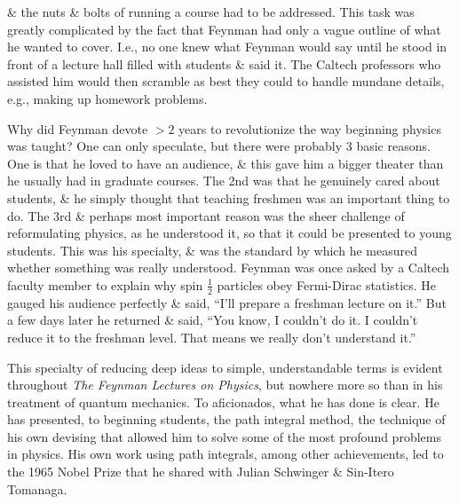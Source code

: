 \documentclass{article}
\begin{document}
\& the nuts \& bolts of running a course had to be addressed. This task was greatly complicated by the fact that {\sc Feynman} had only a vague outline of what he wanted to cover. I.e., no one knew what {\sc Feynman} would say until he stood in front of a lecture hall filled with students \& said it. The Caltech professors who assisted him would then scramble as best they could to handle mundane details, e.g., making up homework problems.

Why did {\sc Feynman} devote $> 2$ years to revolutionize the way beginning physics was taught? One can only speculate, but there were probably 3 basic reasons. One is that he loved to have an audience, \& this gave him a bigger theater than he usually had in graduate courses. The 2nd was that he genuinely cared about students, \& he simply thought that teaching freshmen was an important thing to do. The 3rd \& perhaps most important reason was the sheer challenge of reformulating physics, as he understood it, so that it could be presented to young students. This was his specialty, \& was the standard by which he measured whether something was really understood. {\sc Feynman} was once asked by a Caltech faculty member to explain why spin $\frac{1}{2}$ particles obey Fermi-Dirac statistics. He gauged his audience perfectly \& said, ``I'll prepare a freshman lecture on it.'' But a few days later he returned \& said, ``You know, I couldn't do it. I couldn't reduce it to the freshman level. That means we really don't understand it.''

This specialty of reducing deep ideas to simple, understandable terms is evident throughout {\it The Feynman Lectures on Physics}, but nowhere more so than in his treatment of quantum mechanics. To aficionados, what he has done is clear. He has presented, to beginning students, the path integral method, the technique of his own devising that allowed him to solve some of the most profound problems in physics. His own work using path integrals, among other achievements, led to the 1965 Nobel Prize that he shared with Julian Schwinger \& Sin-Itero Tomanaga.
\end{document}
